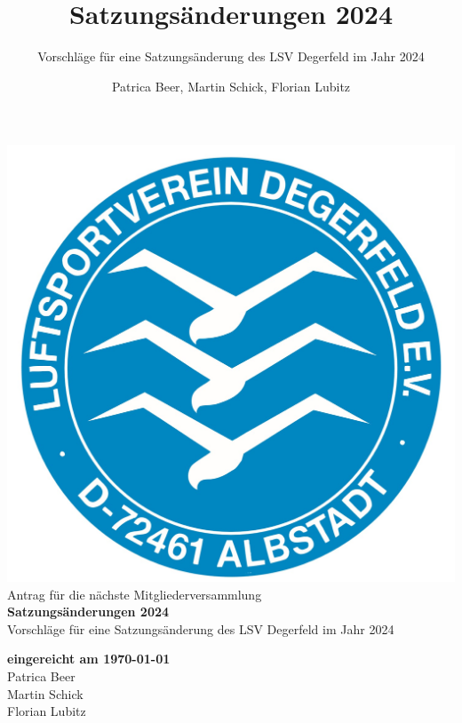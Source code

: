 \documentclass[10pt,a4paper,parskip=half]{scrartcl}
\title{Satzungsänderungen 2024}
\subtitle{Vorschläge für eine Satzungsänderung des LSV Degerfeld im Jahr 2024}
\author{Patrica Beer, Martin Schick, Florian Lubitz}
\begin{document}
\begin{titlepage}

  \begin{center}
    \includegraphics[scale=0.2]{../logo}\\[15ex]


    \large{Antrag für die nächste Mitgliederversammlung}\\[2ex]

    \LARGE{\textbf{Satzungsänderungen 2024}}\\[2ex]
    \large{Vorschläge für eine Satzungsänderung des LSV Degerfeld im Jahr 2024}\\[30ex]

    \normalsize

    \textbf{eingereicht am {\today}}\\[1.5ex]
    Patrica Beer\\ Martin Schick\\ Florian Lubitz
    \\[3ex]

  \end{center}

\end{titlepage}
\end{document}
